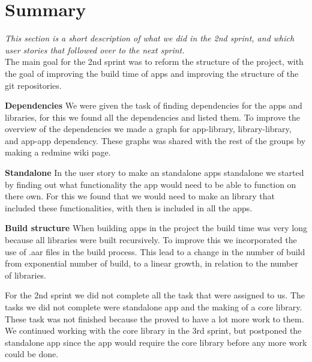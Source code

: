 \section{Summary} 
\textit{This section is a short description of what we did in the 2nd sprint, and which user stories that followed over to the next sprint.}\\

The main goal for the 2nd sprint was to reform the structure of the project, with the goal of improving the build time of apps and improving the structure of the git repositories.


\textbf{Dependencies}
We were given the task of finding dependencies for the apps and libraries, for this we found all the dependencies and listed them. To improve the overview of the dependencies we made a graph for app-library, library-library, and app-app dependency. These graphs was shared with the rest of the groups by making a redmine wiki page.

\textbf{Standalone}
In the user story to make an standalone apps standalone we started by finding out what functionality the app would need to be able to function on there own. For this we found that we would need to make an library that included these functionalities, with then is included in all the apps.

\textbf{Build structure}
When building apps in the project the build time was very long because all libraries were built recursively. To improve this we incorporated the use of .aar files in the build process. This lead to a change in the number of build from exponential number of build, to a linear growth, in relation to the number of libraries.

For the 2nd sprint we did not complete all the task that were assigned to us. The tasks we did not complete were standalone app and the making of a core library. These task was not finished because the proved to have a lot more work to them. We continued working with the core library in the 3rd sprint, but postponed the standalone app since the app would require the core library before any more work could be done.